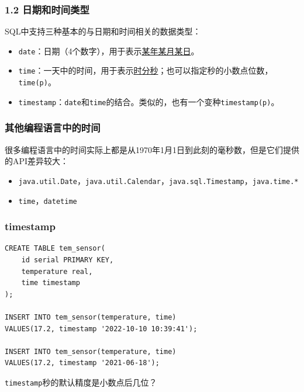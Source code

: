 \documentclass[aspectratio=169, 14pt]{beamer}
\begin{document}
\begin{frame}
    \frametitle{1.2 日期和时间类型}
SQL中支持三种基本的与日期和时间相关的数据类型：

\begin{itemize}
    \item \alert{\texttt{date}}：日期（4个数字），用于表示\underline{某年某月某日}。
    \item \alert{\texttt{time}}：一天中的时间，用于表示\underline{时分秒}；也可以指定秒的小数点位数，\alert{\texttt{time(p)}}。
    \item \alert{\texttt{timestamp}}：\texttt{date}和\texttt{time}的结合。类似的，也有一个变种\alert{\texttt{timestamp(p)}}。
\end{itemize}

\end{frame}

\begin{frame}
    \frametitle{其他编程语言中的时间}
很多编程语言中的时间实际上都是从1970年1月1日到此刻的毫秒数，但是它们提供的API差异较大：

\begin{itemize}
    \item {} \texttt{java.util.Date}，\texttt{java.util.Calendar}，\texttt{java.sql.Timestamp}，\texttt{java.time.*}
    \item {} \texttt{time}，\texttt{datetime}
\end{itemize}

\end{frame}

\begin{frame}[fragile]
    \frametitle{timestamp}

    \begin{verbatim}
CREATE TABLE tem_sensor(
    id serial PRIMARY KEY,
    temperature real,
    time timestamp
);

INSERT INTO tem_sensor(temperature, time)
VALUES(17.2, timestamp '2022-10-10 10:39:41');

INSERT INTO tem_sensor(temperature, time)
VALUES(17.2, timestamp '2021-06-18');
    \end{verbatim}
 \texttt{timestamp}秒的默认精度是小数点后几位？
\end{frame}
\end{document}
